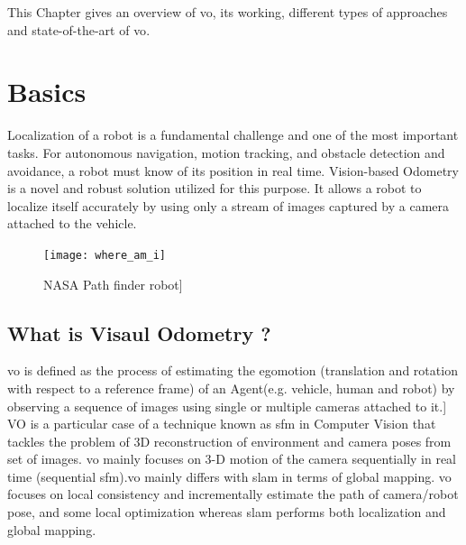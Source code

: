 This Chapter gives an overview of \acrlong{vo}, its working, different types of approaches and state-of-the-art of \acrlong{vo}.   

\section{Basics}
Localization of a robot is a fundamental challenge and one of the most
important tasks. For autonomous navigation, motion tracking, and obstacle detection and avoidance, a robot must know of its position in real time. Vision-based Odometry is a novel and robust solution utilized for this purpose.\cite{Aqel-et-al-2016} It allows a robot to localize itself accurately by using only a stream of images captured by a camera attached to the vehicle.

\begin{figure}[h]
	\centering
	\texttt{[image: where\_am\_i]}
	\caption{NASA Path finder robot\cite{Online}]}
\end{figure}

\subsection{What is Visaul Odometry ?}
\acrshort{vo} is defined as the process of estimating the egomotion (translation and rotation with respect to a reference frame) of an Agent(e.g. vehicle, human and robot) by observing a sequence of images using single or multiple cameras attached to it.\cite{KhalidYousif-et-al-2015}] VO is a particular case of a technique known as \acrfull{sfm} in Computer Vision that tackles the problem of 3D reconstruction of environment and camera poses from set of images\cite{ScaramuzzaVO}. \acrshort{vo} mainly focuses on 3-D motion of the camera sequentially in real time (sequential \acrshort{sfm}).\acrshort{vo} mainly differs with \acrshort{slam} in terms of global mapping. \acrshort{vo} focuses on local consistency and incrementally estimate the path of camera/robot pose, and some local optimization whereas \acrshort{slam} performs both localization and global mapping.

